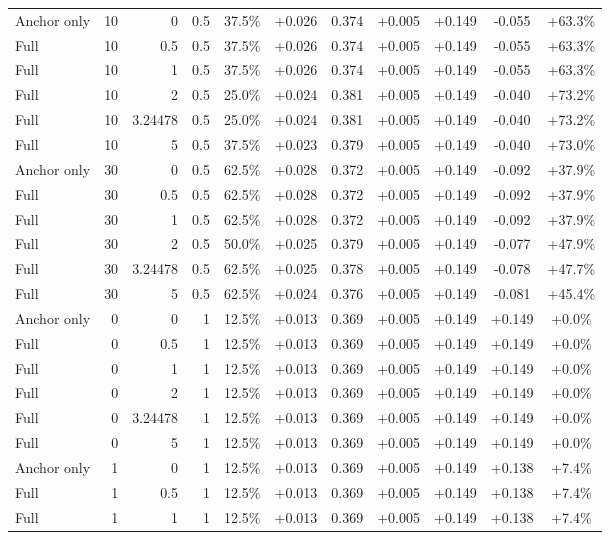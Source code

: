 \begin{table}[htbp]
\begin{tabular}{lrrrccccccc}
Anchor only & 10 & 0 & 0.5 & 37.5\% & +0.026 & 0.374 & +0.005 & +0.149 & -0.055 & +63.3\% \\
Full & 10 & 0.5 & 0.5 & 37.5\% & +0.026 & 0.374 & +0.005 & +0.149 & -0.055 & +63.3\% \\
Full & 10 & 1 & 0.5 & 37.5\% & +0.026 & 0.374 & +0.005 & +0.149 & -0.055 & +63.3\% \\
Full & 10 & 2 & 0.5 & 25.0\% & +0.024 & 0.381 & +0.005 & +0.149 & -0.040 & +73.2\% \\
Full & 10 & 3.24478 & 0.5 & 25.0\% & +0.024 & 0.381 & +0.005 & +0.149 & -0.040 & +73.2\% \\
Full & 10 & 5 & 0.5 & 37.5\% & +0.023 & 0.379 & +0.005 & +0.149 & -0.040 & +73.0\% \\
Anchor only & 30 & 0 & 0.5 & 62.5\% & +0.028 & 0.372 & +0.005 & +0.149 & -0.092 & +37.9\% \\
Full & 30 & 0.5 & 0.5 & 62.5\% & +0.028 & 0.372 & +0.005 & +0.149 & -0.092 & +37.9\% \\
Full & 30 & 1 & 0.5 & 62.5\% & +0.028 & 0.372 & +0.005 & +0.149 & -0.092 & +37.9\% \\
Full & 30 & 2 & 0.5 & 50.0\% & +0.025 & 0.379 & +0.005 & +0.149 & -0.077 & +47.9\% \\
Full & 30 & 3.24478 & 0.5 & 62.5\% & +0.025 & 0.378 & +0.005 & +0.149 & -0.078 & +47.7\% \\
Full & 30 & 5 & 0.5 & 62.5\% & +0.024 & 0.376 & +0.005 & +0.149 & -0.081 & +45.4\% \\
Anchor only & 0 & 0 & 1 & 12.5\% & +0.013 & 0.369 & +0.005 & +0.149 & +0.149 & +0.0\% \\
Full & 0 & 0.5 & 1 & 12.5\% & +0.013 & 0.369 & +0.005 & +0.149 & +0.149 & +0.0\% \\
Full & 0 & 1 & 1 & 12.5\% & +0.013 & 0.369 & +0.005 & +0.149 & +0.149 & +0.0\% \\
Full & 0 & 2 & 1 & 12.5\% & +0.013 & 0.369 & +0.005 & +0.149 & +0.149 & +0.0\% \\
Full & 0 & 3.24478 & 1 & 12.5\% & +0.013 & 0.369 & +0.005 & +0.149 & +0.149 & +0.0\% \\
Full & 0 & 5 & 1 & 12.5\% & +0.013 & 0.369 & +0.005 & +0.149 & +0.149 & +0.0\% \\
Anchor only & 1 & 0 & 1 & 12.5\% & +0.013 & 0.369 & +0.005 & +0.149 & +0.138 & +7.4\% \\
Full & 1 & 0.5 & 1 & 12.5\% & +0.013 & 0.369 & +0.005 & +0.149 & +0.138 & +7.4\% \\
Full & 1 & 1 & 1 & 12.5\% & +0.013 & 0.369 & +0.005 & +0.149 & +0.138 & +7.4\% \\

\end{tabular}
\end{table}
